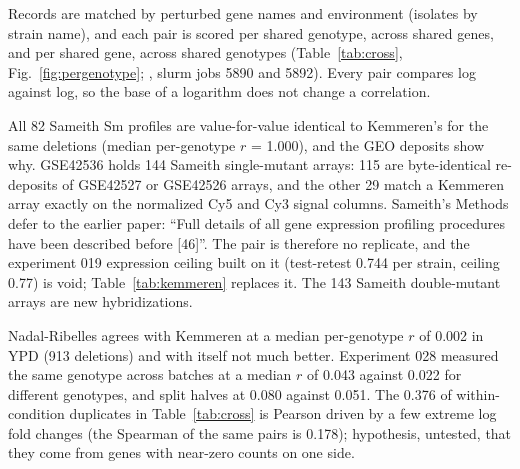 Records are matched by perturbed gene names and environment (isolates by strain name),
and each pair is scored per shared genotype, across shared genes, and per shared gene,
across shared genotypes (Table~\ref{tab:cross}, Fig.~\ref{fig:pergenotype};
,
slurm jobs 5890 and 5892). Every pair compares log against log, so the base of a
logarithm does not change a correlation.

\begin{table}[htbp]
\centering
\scriptsize
\setlength{\tabcolsep}{3pt}
\caption[]{\textbf{Agreement between datasets of the same readout type.} Per genotype:
Pearson and Spearman across the shared genes (at least 20). Per gene: Pearson across the
shared genotypes (at least 5). Jackson is turned into a deletion effect against HO in the
same environment; Messner and Zelezniak are log ratios to their record reference; Caudal
and Muenzner are centered per gene over the isolates. The Jackson environment row pairs
one genotype across two environments (605 genotype-environment pairs).}
\label{tab:cross}

\end{table}

All 82 Sameith Sm profiles are value-for-value identical to Kemmeren's for the same
deletions (median per-genotype $r$ = 1.000), and the GEO deposits show why. GSE42536
holds 144 Sameith single-mutant arrays: 115 are byte-identical re-deposits of GSE42527 or
GSE42526 arrays, and the other 29 match a Kemmeren array exactly on the normalized Cy5
and Cy3 signal columns. Sameith's Methods defer to the earlier paper: ``Full details of
all gene expression profiling procedures have been described before [46]''. The pair is
therefore no replicate, and the experiment 019 expression ceiling built on it
(test-retest 0.744 per strain, ceiling 0.77) is void; Table~\ref{tab:kemmeren} replaces
it. The 143 Sameith double-mutant arrays are new hybridizations.

Nadal-Ribelles agrees with Kemmeren at a median per-genotype $r$ of 0.002 in YPD (913
deletions) and with itself not much better. Experiment 028 measured the same genotype
across batches at a median $r$ of 0.043 against 0.022 for different genotypes, and
split halves at 0.080 against 0.051. The 0.376 of within-condition duplicates in
Table~\ref{tab:cross} is Pearson driven by a few extreme log fold changes (the Spearman
of the same pairs is 0.178); hypothesis, untested, that they come from genes with
near-zero counts on one side.

